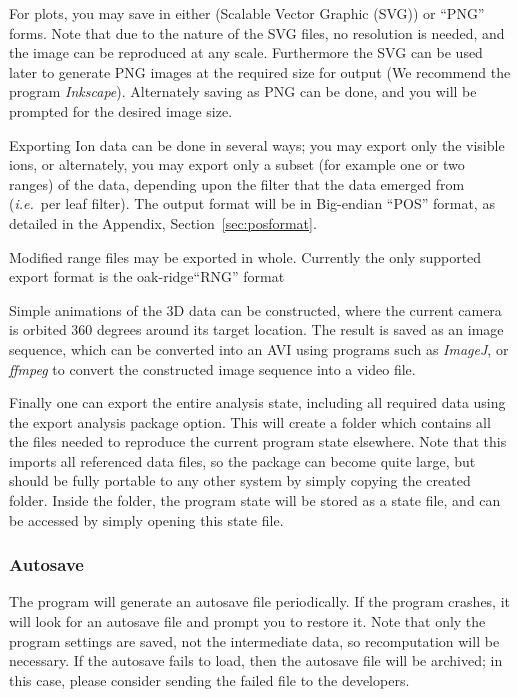 \documentclass[10pt]{article}
\begin{document}
For plots, you may save in either (Scalable Vector Graphic (SVG)) or ``PNG'' forms. Note that due to the nature of the SVG files, no resolution is needed, and the image can be reproduced at any scale. Furthermore the SVG can be used later to generate PNG images at the required size for output (We recommend the program \textit{Inkscape}). Alternately saving as PNG can be done, and you will be prompted for the desired image size.

Exporting Ion data can be done in several ways; you may export only the visible ions, or alternately, you may export only a subset (for example one or two ranges) of the data, depending upon the filter that the data emerged from (\emph{i.e.}\ per leaf filter). The output format will be in Big-endian ``POS'' format, as  detailed in the Appendix, Section~\ref{sec:posformat}.

Modified range files may be exported in whole. Currently the only supported export format is the oak-ridge``RNG'' format

Simple animations of the 3D data can be constructed, where the current camera is orbited 360 degrees around its target location. The result is saved as an image sequence, which can be converted into an AVI using programs such as \emph{ImageJ}, or \emph{ffmpeg} to convert the constructed image sequence into a video file.

Finally one can export the entire analysis state, including all required data using the export analysis package option. This will create  a folder which contains all the files needed to reproduce the current program state elsewhere. Note that this imports all referenced data files, so the package can become quite large, but should be fully portable to any other system by simply copying the created folder. Inside the folder, the program state will be stored as a state file, and can be accessed by simply opening this state file.

\subsubsection{Autosave}
The program will generate an autosave file periodically. If the program crashes, it will look for an autosave file and prompt you to restore it. Note that only the program settings are saved, not the intermediate data, so recomputation will be necessary. If the autosave fails to load, then the autosave file will be archived; in this case, please consider sending the failed file to the developers.
\end{document}
